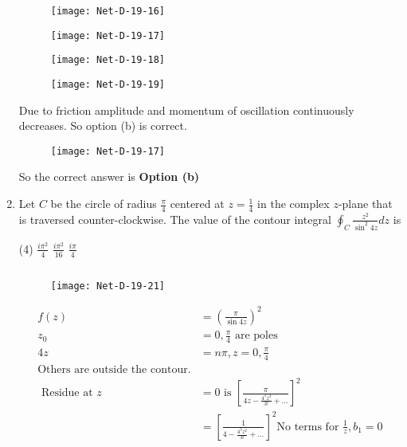 \begin{enumerate}
\begin{tasks}
\begin{figure}[H]
		\centering
		\texttt{[image: Net-D-19-16]}
	\end{figure}
	\task[\textbf{b.}]
		\begin{figure}[H]
		\centering
		\texttt{[image: Net-D-19-17]}
	\end{figure}
	\task[\textbf{c.}]
		\begin{figure}[H]
		\centering
		\texttt{[image: Net-D-19-18]}
	\end{figure}
	\task[\textbf{d.}] 
		\begin{figure}[H]
		\centering
		\texttt{[image: Net-D-19-19]}
	\end{figure}
\end{tasks}
\begin{answer}
 Due to friction amplitude and momentum of oscillation continuously decreases. So option (b) is correct.
 \begin{figure}[H]
 	\centering
 	\texttt{[image: Net-D-19-17]}
 \end{figure}
	So the correct answer is \textbf{Option (b)}
\end{answer}
\item Let $C$ be the circle of radius $\frac{\pi}{4}$ centered at $z=\frac{1}{4}$ in the complex $z$-plane that is traversed counter-clockwise. The value of the contour integral $\oint_{C} \frac{z^{2}}{\sin ^{2} 4 z} d z$ is
 \begin{tasks}(4)
	\task[\textbf{b.}]$\frac{i \pi^{2}}{4}$
	\task[\textbf{c.}] $\frac{i \pi^{2}}{16}$
	\task[\textbf{d.}] $\frac{i \pi}{4}$
\end{tasks}
\begin{answer}$\left. \right. $
	\begin{figure}[H]
		\centering
		\texttt{[image: Net-D-19-21]}
	\end{figure}
	\begin{align*}
	f(z)&=\left(\frac{\pi}{\sin 4 z}\right)^{2}\\
	z_{0}&=0, \frac{\pi}{4}\text{ are poles}\\
	4 z&=n \pi, z=0, \frac{\pi}{4}\\
	\text{Others are outside the contour.}\\
	\text { Residue at } z&=0 \text { is }\left[\frac{\pi}{4 z-\frac{4^{3} z^{3}}{3 !}+\ldots}\right]^{2}\\
	&=\left[\frac{1}{4-\frac{4^{3} z^{2}}{3 !}+\ldots}\right]^{2}
	\text{No terms for $\frac{1}{z}, b_{1}=0$}\\

\end{align*}
\end{answer}
\end{enumerate}
